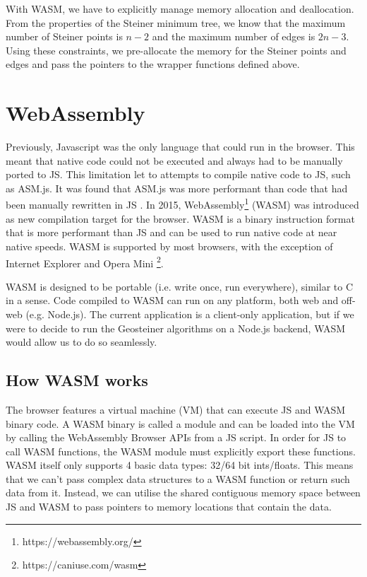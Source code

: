 \documentclass{l4proj}
\begin{document}
With WASM, we have to explicitly manage memory allocation and deallocation. From the properties of the Steiner minimum tree, we know that the maximum number of Steiner points is $n - 2$ and the maximum number of edges is $2n - 3$. Using these constraints, we pre-allocate the memory for the Steiner points and edges and pass the pointers to the wrapper functions defined above.


\section{WebAssembly}
\label{sec:webassembly}
Previously, Javascript was the only language that could run in the browser. This meant that native code could not be executed and always had to be manually ported to JS.
This limitation let to attempts to compile native code to JS, such as ASM.js. It was found that ASM.js was more performant than code that had been manually rewritten in JS \citep{WebAssemblyIntro}.
In 2015, WebAssembly\footnote{https://webassembly.org/} (WASM) was introduced as new compilation target for the browser. WASM is a binary instruction format that is more performant than JS and can be used to run native code at near native speeds.
WASM is supported by most browsers, with the exception of Internet Explorer and Opera Mini \footnote{https://caniuse.com/wasm}.

WASM is designed to be portable (i.e. write once, run everywhere), similar to C in a sense. Code compiled to WASM can run on any platform, both web and off-web (e.g. Node.js).
The current application is a client-only application, but if we were to decide to run the Geosteiner algorithms on a Node.js backend, WASM would allow us to do so seamlessly.

\subsection{How WASM works}
The browser features a virtual machine (VM) that can execute JS and WASM binary code. A WASM binary is called a module and can be loaded into the VM by calling the WebAssembly Browser APIs from a JS script.
In order for JS to call WASM functions, the WASM module must explicitly export these functions. WASM itself only supports 4 basic data types: 32/64 bit ints/floats. This means that we can't pass complex data structures to a WASM function or return such data from it.
Instead, we can utilise the shared contiguous memory space between JS and WASM to pass pointers to memory locations that contain the data.
\end{document}

